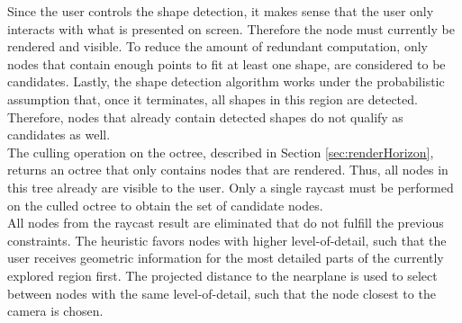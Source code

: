 Since the user controls the shape detection, it makes sense that the user only interacts with what is presented on screen. Therefore the node must currently be rendered and visible. To reduce the amount of redundant computation, only nodes that contain enough points to fit at least one shape, are considered to be candidates. Lastly, the shape detection algorithm works under the probabilistic assumption that, once it terminates, all shapes in this region are detected. Therefore, nodes that already contain detected shapes do not qualify as candidates as well. 
\\
The culling operation on the octree, described in Section \ref{sec:renderHorizon}, returns an octree that only contains nodes that are rendered. Thus, all nodes in this tree already are visible to the user. Only a single raycast must be performed on the culled octree to obtain the set of candidate nodes. 
\\
All nodes from the raycast result are eliminated that do not fulfill the previous constraints. The heuristic favors nodes with higher level-of-detail, such that the user receives geometric information for the most detailed parts of the currently explored region first. The projected distance to the nearplane is used to select between nodes with the same level-of-detail, such that the node closest to the camera is chosen. 
\\
\\

    

